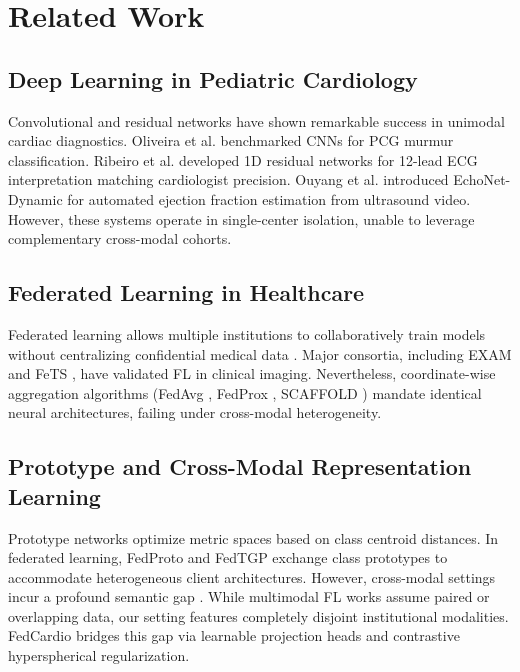 \documentclass[conference]{IEEEtran}
\begin{document}
\section{Related Work}

\subsection{Deep Learning in Pediatric Cardiology}
Convolutional and residual networks have shown remarkable success in unimodal cardiac diagnostics. Oliveira et al. \cite{oliveira2022circor} benchmarked CNNs for PCG murmur classification. Ribeiro et al. \cite{ribeiro2020automatic} developed 1D residual networks for 12-lead ECG interpretation matching cardiologist precision. Ouyang et al. \cite{ouyang2020video} introduced EchoNet-Dynamic for automated ejection fraction estimation from ultrasound video. However, these systems operate in single-center isolation, unable to leverage complementary cross-modal cohorts.

\subsection{Federated Learning in Healthcare}
Federated learning allows multiple institutions to collaboratively train models without centralizing confidential medical data \cite{mcmahan2017communication, xu2021federated}. Major consortia, including EXAM \cite{dayan2021federated} and FeTS \cite{pati2022federated}, have validated FL in clinical imaging. Nevertheless, coordinate-wise aggregation algorithms (FedAvg \cite{mcmahan2017communication}, FedProx \cite{li2020federated}, SCAFFOLD \cite{karimireddy2020scaffold}) mandate identical neural architectures, failing under cross-modal heterogeneity.

\subsection{Prototype and Cross-Modal Representation Learning}
Prototype networks \cite{snell2017prototypical} optimize metric spaces based on class centroid distances. In federated learning, FedProto \cite{tan2022fedproto} and FedTGP \cite{zhang2024fedtgp} exchange class prototypes to accommodate heterogeneous client architectures. However, cross-modal settings incur a profound semantic gap \cite{le2024multimodal}. While multimodal FL works \cite{feng2023fedmultimodal, chen2023federated} assume paired or overlapping data, our setting features completely disjoint institutional modalities. FedCardio bridges this gap via learnable projection heads and contrastive hyperspherical regularization.
\end{document}
